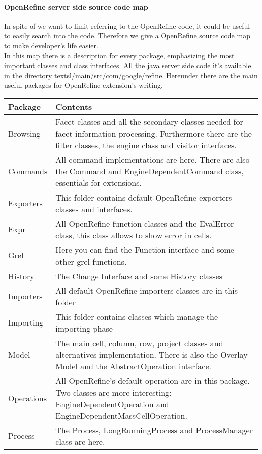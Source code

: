 \paragraph{OpenRefine server side source code map}
In spite of we want to limit referring to the OpenRefine code, it could be useful to easily search into the code. Therefore we give a OpenRefine source code map to make developer's life easier.\\
In this map there is a description for every package, emphasizing the most important classes and class interfaces. All the java server side code it's available in the directory textsl{/main/src/com/google/refine}.
Hereunder there are the main useful packages for OpenRefine extension's writing.
\begin{center}
    \begin{tabular}{  l |  p{9cm} }
    \hline
    Package & Contents \\ \hline
    Browsing & Facet classes and all the secondary classes needed for facet information processing. Furthermore there are the filter classes, the engine class and visitor interfaces. \\ \hline
    Commands & All command implementations are here. There are also the Command and EngineDependentCommand class, essentials for extensions. \\ \hline
    Exporters & This folder contains default OpenRefine exporters classes and interfaces. \\ \hline 
    Expr & All OpenRefine function classes and the EvalError class, this class allows to show error in cells. \\ \hline 
    Grel & Here you can find the Function interface and some other grel functions. \\ \hline
    History & The Change Interface and some History classes \\ \hline
    Importers & All default OpenRefine importers classes are in this folder\\
     \hline
    Importing & This folder contains classes which manage the importing phase \\ \hline
     Model & The main cell, column, row, project classes and alternatives implementation. There is also the Overlay Model and the AbstractOperation interface.\\ \hline
     Operations & All OpenRefine's default operation are in this package. Two classes are more interesting: EngineDependentOperation and EngineDependentMassCellOperation. \\ \hline
     Process & The Process, LongRunningProcess and ProcessManager class are here. \\ \hline
    \end{tabular}
\end{center}



